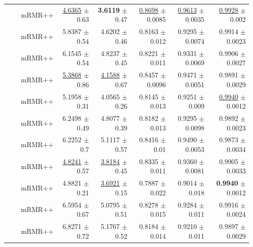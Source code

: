 \begin{longtable}{llp{}rrrrr}
 &  & mRMR++ & \underline{4.6365} {\scriptsize $\pm$ 0.63} & \textbf{3.6119} {\scriptsize $\pm$ 0.47} & \underline{0.8698} {\scriptsize $\pm$ 0.0085} & \underline{0.9613} {\scriptsize $\pm$ 0.0035} & \underline{0.9928} {\scriptsize $\pm$ 0.002} \\
 &  & mRMR++ & 5.8387 {\scriptsize $\pm$ 0.54} & 4.6202 {\scriptsize $\pm$ 0.46} & 0.8163 {\scriptsize $\pm$ 0.012} & 0.9295 {\scriptsize $\pm$ 0.0074} & 0.9914 {\scriptsize $\pm$ 0.0023} \\
 &  & mRMR++ & 6.1545 {\scriptsize $\pm$ 0.54} & 4.8237 {\scriptsize $\pm$ 0.45} & 0.8221 {\scriptsize $\pm$ 0.011} & 0.9331 {\scriptsize $\pm$ 0.0069} & 0.9906 {\scriptsize $\pm$ 0.0027} \\
 &  & mRMR++ & \underline{5.3868} {\scriptsize $\pm$ 0.86} & \underline{4.1588} {\scriptsize $\pm$ 0.67} & 0.8457 {\scriptsize $\pm$ 0.0096} & 0.9471 {\scriptsize $\pm$ 0.0051} & 0.9891 {\scriptsize $\pm$ 0.0029} \\
 &  & mRMR++ & 5.1958 {\scriptsize $\pm$ 0.31} & 4.0565 {\scriptsize $\pm$ 0.26} & 0.8145 {\scriptsize $\pm$ 0.013} & 0.9251 {\scriptsize $\pm$ 0.009} & \underline{0.9940} {\scriptsize $\pm$ 0.0012} \\
 &  & mRMR++ & 6.2498 {\scriptsize $\pm$ 0.49} & 4.8077 {\scriptsize $\pm$ 0.39} & 0.8182 {\scriptsize $\pm$ 0.013} & 0.9295 {\scriptsize $\pm$ 0.0098} & 0.9892 {\scriptsize $\pm$ 0.0023} \\
 &  & mRMR++ & 6.2252 {\scriptsize $\pm$ 0.7} & 5.1117 {\scriptsize $\pm$ 0.57} & 0.8416 {\scriptsize $\pm$ 0.01} & 0.9490 {\scriptsize $\pm$ 0.0053} & 0.9873 {\scriptsize $\pm$ 0.0034} \\
 &  & mRMR++ & \underline{4.8241} {\scriptsize $\pm$ 0.57} & \underline{3.8184} {\scriptsize $\pm$ 0.45} & 0.8335 {\scriptsize $\pm$ 0.011} & 0.9360 {\scriptsize $\pm$ 0.0081} & 0.9905 {\scriptsize $\pm$ 0.0033} \\
 &  & mRMR++ & 4.8821 {\scriptsize $\pm$ 0.21} & \underline{3.6921} {\scriptsize $\pm$ 0.15} & 0.7887 {\scriptsize $\pm$ 0.022} & 0.9014 {\scriptsize $\pm$ 0.018} & \textbf{0.9940} {\scriptsize $\pm$ 0.0012} \\
 &  & mRMR++ & 6.5954 {\scriptsize $\pm$ 0.67} & 5.0795 {\scriptsize $\pm$ 0.51} & 0.8278 {\scriptsize $\pm$ 0.015} & 0.9284 {\scriptsize $\pm$ 0.011} & 0.9916 {\scriptsize $\pm$ 0.0024} \\
 &  & mRMR++ & 6.8271 {\scriptsize $\pm$ 0.72} & 5.1767 {\scriptsize $\pm$ 0.52} & 0.8184 {\scriptsize $\pm$ 0.014} & 0.9210 {\scriptsize $\pm$ 0.011} & 0.9897 {\scriptsize $\pm$ 0.0029} \\

\end{longtable}
